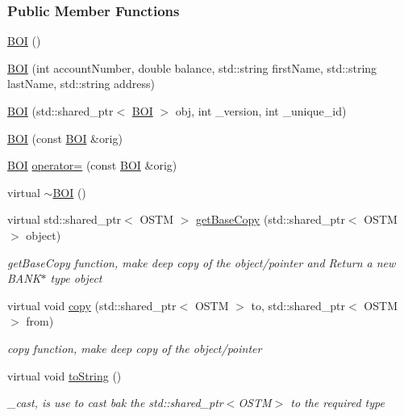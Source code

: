 \subsubsection*{Public Member Functions}
\begin{DoxyCompactItemize}
\item 
\hyperlink{class_b_o_i_a6af682a5f199a029681f0cb2b8658706}{B\+OI} ()
\item 
\hyperlink{class_b_o_i_a1807bd07cad08109c974edbb2c32591c}{B\+OI} (int account\+Number, double balance, std\+::string first\+Name, std\+::string last\+Name, std\+::string address)
\item 
\hyperlink{class_b_o_i_ae4263940f8ffdd40d5f01a714b20f791}{B\+OI} (std\+::shared\+\_\+ptr$<$ \hyperlink{class_b_o_i}{B\+OI} $>$ obj, int \+\_\+version, int \+\_\+unique\+\_\+id)
\item 
\hyperlink{class_b_o_i_a7757de8d3ac656871bed4b07d77457ff}{B\+OI} (const \hyperlink{class_b_o_i}{B\+OI} \&orig)
\item 
\hyperlink{class_b_o_i}{B\+OI} \hyperlink{class_b_o_i_a4b4a3976cc13c4d3de0d7ff8882a7af3}{operator=} (const \hyperlink{class_b_o_i}{B\+OI} \&orig)
\item 
virtual \hyperlink{class_b_o_i_a617f46a599129178c6b11b4846759a6c}{$\sim$\+B\+OI} ()
\item 
virtual std\+::shared\+\_\+ptr$<$ O\+S\+TM $>$ \hyperlink{class_b_o_i_ad53ae2918a656793b9d7a670d35ecfa3}{get\+Base\+Copy} (std\+::shared\+\_\+ptr$<$ O\+S\+TM $>$ object)
\begin{DoxyCompactList}\small\item\em get\+Base\+Copy function, make deep copy of the object/pointer and Return a new B\+A\+N\+K$\ast$ type object \end{DoxyCompactList}\item 
virtual void \hyperlink{class_b_o_i_a9ff2d32c25c23a1bea6316f50c3bf677}{copy} (std\+::shared\+\_\+ptr$<$ O\+S\+TM $>$ to, std\+::shared\+\_\+ptr$<$ O\+S\+TM $>$ from)
\begin{DoxyCompactList}\small\item\em copy function, make deep copy of the object/pointer \end{DoxyCompactList}\item 
virtual void \hyperlink{class_b_o_i_ab02a4dd4ebcc5b2abfaca19f2dff2006}{to\+String} ()
\begin{DoxyCompactList}\small\item\em \+\_\+cast, is use to cast bak the std\+::shared\+\_\+ptr$<$\+O\+S\+T\+M$>$ to the required type \end{DoxyCompactList}\item 

\end{DoxyCompactItemize}
